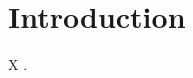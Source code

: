 \documentclass{article}
\begin{document}
\section{Introduction}
X \cite{greenwade93}.


\end{document}
